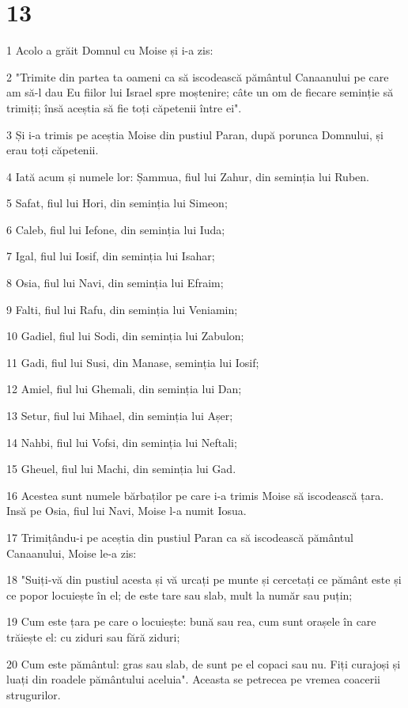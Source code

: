\chapter{13}

\par 1 Acolo a grăit Domnul cu Moise și i-a zis:
\par 2 "Trimite din partea ta oameni ca să iscodească pământul Canaanului pe care am să-l dau Eu fiilor lui Israel spre moștenire; câte un om de fiecare seminție să trimiți; însă aceștia să fie toți căpetenii între ei".
\par 3 Și i-a trimis pe aceștia Moise din pustiul Paran, după porunca Domnului, și erau toți căpetenii.
\par 4 Iată acum și numele lor: Șammua, fiul lui Zahur, din seminția lui Ruben.
\par 5 Safat, fiul lui Hori, din seminția lui Simeon;
\par 6 Caleb, fiul lui Iefone, din seminția lui Iuda;
\par 7 Igal, fiul lui Iosif, din seminția lui Isahar;
\par 8 Osia, fiul lui Navi, din seminția lui Efraim;
\par 9 Falti, fiul lui Rafu, din seminția lui Veniamin;
\par 10 Gadiel, fiul lui Sodi, din seminția lui Zabulon;
\par 11 Gadi, fiul lui Susi, din Manase, seminția lui Iosif;
\par 12 Amiel, fiul lui Ghemali, din seminția lui Dan;
\par 13 Setur, fiul lui Mihael, din seminția lui Așer;
\par 14 Nahbi, fiul lui Vofsi, din seminția lui Neftali;
\par 15 Gheuel, fiul lui Machi, din seminția lui Gad.
\par 16 Acestea sunt numele bărbaților pe care i-a trimis Moise să iscodească țara. Insă pe Osia, fiul lui Navi, Moise l-a numit Iosua.
\par 17 Trimițându-i pe aceștia din pustiul Paran ca să iscodească pământul Canaanului, Moise le-a zis:
\par 18 "Suiți-vă din pustiul acesta și vă urcați pe munte și cercetați ce pământ este și ce popor locuiește în el; de este tare sau slab, mult la număr sau puțin;
\par 19 Cum este țara pe care o locuiește: bună sau rea, cum sunt orașele în care trăiește el: cu ziduri sau fără ziduri;
\par 20 Cum este pământul: gras sau slab, de sunt pe el copaci sau nu. Fiți curajoși și luați din roadele pământului aceluia". Aceasta se petrecea pe vremea coacerii strugurilor.
